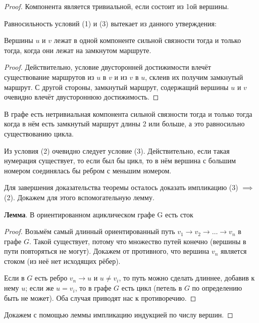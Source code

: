 \documentclass[a4paper]{article}
\begin{document}
\begin{colloq}
        \begin{proof}
            Компонента является тривиальной, если состоит из 1ой вершины.

            Равносильность условий (1) и (3) вытекает из данного утверждения:

            \begin{statement}
                Вершины $u$ и $v$ лежат в одной компоненте сильной связности тогда и только тогда, когда они лежат на замкнутом маршруте.
            \end{statement}

            \begin{proof}
                Действительно, условие двусторонней достижимости влечёт существование маршрутов из $u$ в $v$ и из $v$ в $u$, склеив их получим замкнутый маршрут. С другой стороны, замкнутый маршрут, содержащий вершины $u$ и $v$ очевидно влечёт двустороннюю достижимость.
            \end{proof}

            В графе есть нетривиальная компонента сильной связности тогда и только тогда
            когда в нём есть замкнутый маршрут длины 2 или больше, а это равносильно
            существованию цикла.

            Из условия (2) очевидно следует условие (3). Действительно, если такая нумерация существует, то если был бы цикл, то в нём вершина с большим номером соединялась бы ребром с меньшим номером.

            Для завершения доказательства теоремы осталось доказать импликацию (3) $\implies$ (2). Докажем для этого вспомогательную лемму.

            \textbf{Лемма}. В ориентированном ациклическом графе G есть сток
            \begin{proof}
                Возьмём самый длинный ориентированный путь $v_1 \to v_2 \to \dots \to v_n$ в графе $G$. Такой существует, потому что множество путей конечно (вершины в пути повторяться не могут). Докажем от противного, что вершина $v_n$ является стоком (из неё нет исходящих рёбер). 

                Если в $G$ есть ребро $v_n \to u$ и $u \neq v_i$, то путь можно сделать длиннее, добавив к нему $u$; если же $u = v_i$, то в графе $G$ есть цикл (петель в $G$ по определению быть не может). Оба случая приводят нас к противоречию.
            \end{proof}

            Докажем с помощью леммы импликацию индукцией по числу вершин. 


\end{proof}
\end{colloq}
\end{document}
